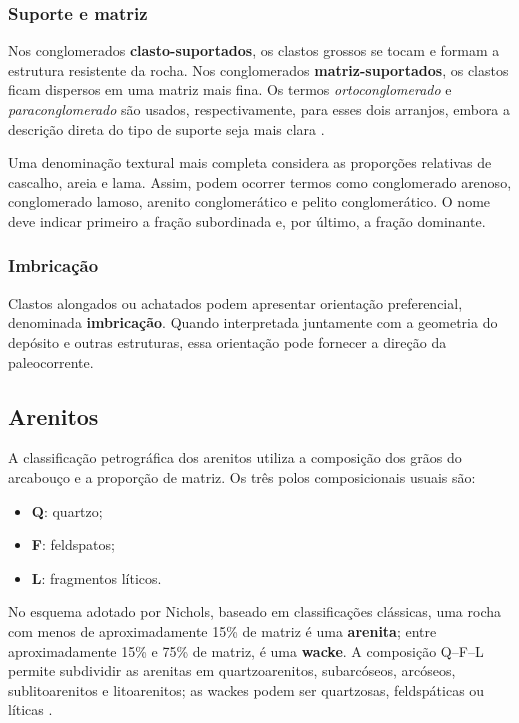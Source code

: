 \subsubsection{Suporte e matriz}

Nos conglomerados \textbf{clasto-suportados}, os clastos grossos se tocam e formam a
estrutura resistente da rocha. Nos conglomerados \textbf{matriz-suportados}, os clastos
ficam dispersos em uma matriz mais fina. Os termos \emph{ortoconglomerado} e
\emph{paraconglomerado} são usados, respectivamente, para esses dois arranjos, embora a
descrição direta do tipo de suporte seja mais clara \parencite{nichols2009}.

Uma denominação textural mais completa considera as proporções relativas de cascalho,
areia e lama. Assim, podem ocorrer termos como conglomerado arenoso, conglomerado
lamoso, arenito conglomerático e pelito conglomerático. O nome deve indicar primeiro a
fração subordinada e, por último, a fração dominante.

\subsubsection{Imbricação}

Clastos alongados ou achatados podem apresentar orientação preferencial, denominada
\textbf{imbricação}. Quando interpretada juntamente com a geometria do depósito e outras
estruturas, essa orientação pode fornecer a direção da paleocorrente.

\subsection{Arenitos}

A classificação petrográfica dos arenitos utiliza a composição dos grãos do arcabouço e
a proporção de matriz. Os três polos composicionais usuais são:

\begin{itemize}
  \item \textbf{Q}: quartzo;
  \item \textbf{F}: feldspatos;
  \item \textbf{L}: fragmentos líticos.
\end{itemize}

No esquema adotado por Nichols, baseado em classificações clássicas, uma rocha com
menos de aproximadamente 15\% de matriz é uma \textbf{arenita}; entre aproximadamente
15\% e 75\% de matriz, é uma \textbf{wacke}. A composição Q--F--L permite subdividir as
arenitas em quartzoarenitos, subarcóseos, arcóseos, sublitoarenitos e litoarenitos; as
wackes podem ser quartzosas, feldspáticas ou líticas
\parencite{dott1964,nichols2009}.


